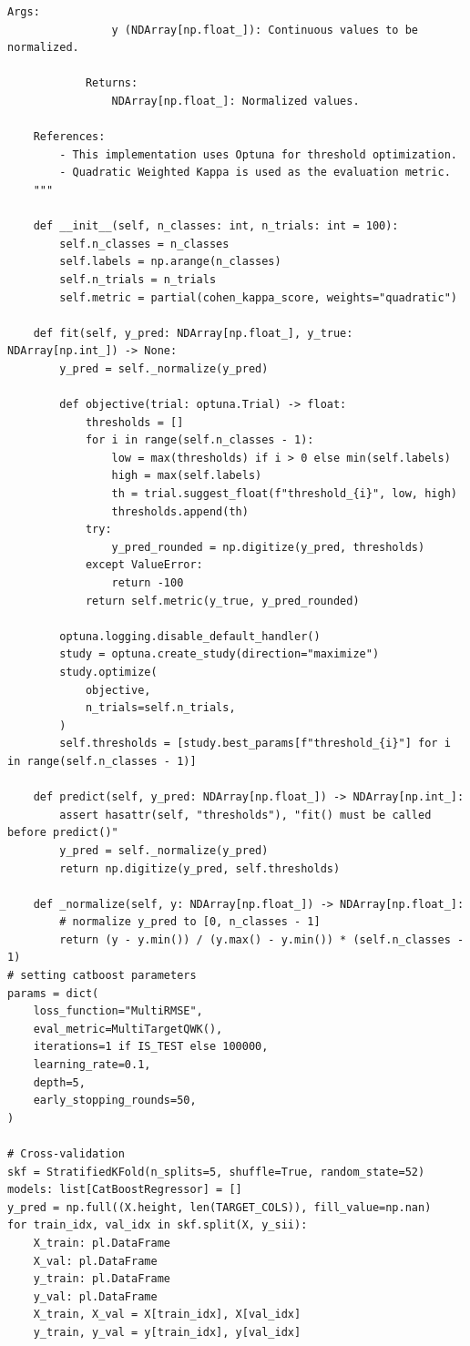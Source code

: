 \documentclass[11pt]{extarticle}
\begin{document}
\begin{mdframed}
\begin{lstlisting}[breaklines=true]
            Args:
                y (NDArray[np.float_]): Continuous values to be normalized.

            Returns:
                NDArray[np.float_]: Normalized values.

    References:
        - This implementation uses Optuna for threshold optimization.
        - Quadratic Weighted Kappa is used as the evaluation metric.
    """

    def __init__(self, n_classes: int, n_trials: int = 100):
        self.n_classes = n_classes
        self.labels = np.arange(n_classes)
        self.n_trials = n_trials
        self.metric = partial(cohen_kappa_score, weights="quadratic")

    def fit(self, y_pred: NDArray[np.float_], y_true: NDArray[np.int_]) -> None:
        y_pred = self._normalize(y_pred)

        def objective(trial: optuna.Trial) -> float:
            thresholds = []
            for i in range(self.n_classes - 1):
                low = max(thresholds) if i > 0 else min(self.labels)
                high = max(self.labels)
                th = trial.suggest_float(f"threshold_{i}", low, high)
                thresholds.append(th)
            try:
                y_pred_rounded = np.digitize(y_pred, thresholds)
            except ValueError:
                return -100
            return self.metric(y_true, y_pred_rounded)

        optuna.logging.disable_default_handler()
        study = optuna.create_study(direction="maximize")
        study.optimize(
            objective,
            n_trials=self.n_trials,
        )
        self.thresholds = [study.best_params[f"threshold_{i}"] for i in range(self.n_classes - 1)]

    def predict(self, y_pred: NDArray[np.float_]) -> NDArray[np.int_]:
        assert hasattr(self, "thresholds"), "fit() must be called before predict()"
        y_pred = self._normalize(y_pred)
        return np.digitize(y_pred, self.thresholds)

    def _normalize(self, y: NDArray[np.float_]) -> NDArray[np.float_]:
        # normalize y_pred to [0, n_classes - 1]
        return (y - y.min()) / (y.max() - y.min()) * (self.n_classes - 1)
# setting catboost parameters
params = dict(
    loss_function="MultiRMSE",
    eval_metric=MultiTargetQWK(),
    iterations=1 if IS_TEST else 100000,
    learning_rate=0.1,
    depth=5,
    early_stopping_rounds=50,
)

# Cross-validation
skf = StratifiedKFold(n_splits=5, shuffle=True, random_state=52)
models: list[CatBoostRegressor] = []
y_pred = np.full((X.height, len(TARGET_COLS)), fill_value=np.nan)
for train_idx, val_idx in skf.split(X, y_sii):
    X_train: pl.DataFrame
    X_val: pl.DataFrame
    y_train: pl.DataFrame
    y_val: pl.DataFrame
    X_train, X_val = X[train_idx], X[val_idx]
    y_train, y_val = y[train_idx], y[val_idx]


\end{lstlisting}
\end{mdframed}
\end{document}
